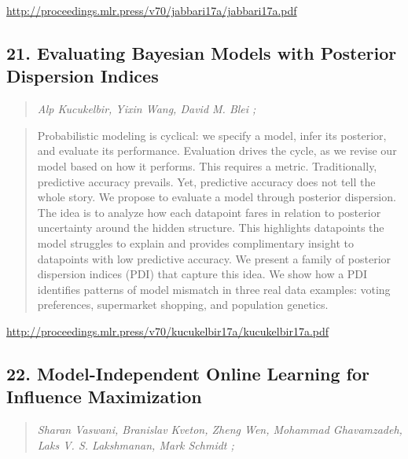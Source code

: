 \documentclass{article}
\begin{document}
\href{http://proceedings.mlr.press/v70/jabbari17a/jabbari17a.pdf}{http://proceedings.mlr.press/v70/jabbari17a/jabbari17a.pdf}

\subsection{21. Evaluating Bayesian Models with Posterior Dispersion Indices}

\begin{quote}
\footnotesize{\textit{Alp Kucukelbir, Yixin Wang, David M. Blei ;}}

\end{quote}

\begin{quote}
    Probabilistic modeling is cyclical: we specify a model, infer its posterior, and evaluate its performance. Evaluation drives the cycle, as we revise our model based on how it performs. This requires a metric. Traditionally, predictive accuracy prevails. Yet, predictive accuracy does not tell the whole story. We propose to evaluate a model through posterior dispersion. The idea is to analyze how each datapoint fares in relation to posterior uncertainty around the hidden structure. This highlights datapoints the model struggles to explain and provides complimentary insight to datapoints with low predictive accuracy. We present a family of posterior dispersion indices (PDI) that capture this idea. We show how a PDI identifies patterns of model mismatch in three real data examples: voting preferences, supermarket shopping, and population genetics.  
\end{quote}

\href{http://proceedings.mlr.press/v70/kucukelbir17a/kucukelbir17a.pdf}{http://proceedings.mlr.press/v70/kucukelbir17a/kucukelbir17a.pdf}

\subsection{22. Model-Independent Online Learning for Influence Maximization}

\begin{quote}
\footnotesize{\textit{Sharan Vaswani, Branislav Kveton, Zheng Wen, Mohammad Ghavamzadeh, Laks V. S. Lakshmanan, Mark Schmidt ;}}

\end{quote}
\end{document}

